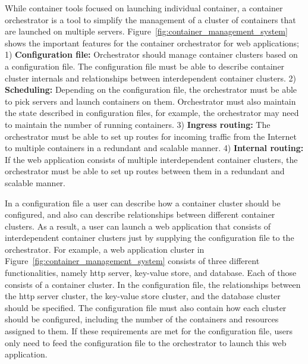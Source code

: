 While container tools focused on launching individual container, a container orchestrator is a tool to simplify the management of a cluster of containers that are launched on multiple servers.
%
%
Figure~\ref{fig:container_management_system} shows the important features for the container orchestrator for web applications;
1) {\bf Configuration file:} Orchestrator should manage container clusters based on a configuration file. 
The configuration file must be able to describe container cluster internals and relationships between interdependent container clusters.
2) {\bf Scheduling:} Depending on the configuration file, the orchestrator must be able to pick servers and launch containers on them.
Orchestrator must also maintain the state described in configuration files, for example, the orchestrator may need to maintain the number of running containers.
3) {\bf Ingress routing:} The orchestrator must be able to set up routes for incoming traffic from the Internet to multiple containers in a redundant and scalable manner.
4) {\bf Internal routing:} If the web application consists of multiple interdependent container clusters, the orchestrator must be able to set up routes between them in a redundant and scalable manner.

In a configuration file a user can describe how a container cluster should be configured, and also can describe relationships between different container clusters.
As a result, a user can launch a web application that consists of interdependent container clusters just by supplying the configuration file to the orchestrator.
For example, a web application cluster in Figure~\ref{fig:container_management_system} consists of three different functionalities, namely http server, key-value store, and database.
Each of those consists of a container cluster.
In the configuration file, the relationships between the http server cluster, the key-value store cluster, and the database cluster should be specified.
The configuration file must also contain how each cluster should be configured, including the number of the containers and resources assigned to them.
If these requirements are met for the configuration file, users only need to feed the configuration file to the orchestrator to launch this web application.

